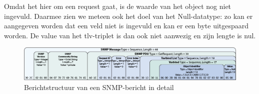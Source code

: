 Omdat het hier om een request gaat, is de waarde van het object nog niet ingevuld.
Daarmee zien we meteen ook het doel van het Null-datatype: zo kan er aangegeven worden dat een veld niet is ingevuld en kan er een byte uitgespaard worden.
De value van het \gls{tlv}-triplet is dan ook niet aanwezig en zijn lengte is nul.

\begin{figure}[h]
	\centering
	\includegraphics[scale=0.40]{figures/snmp/berichtstructuur-3}
	\caption[Berichtstructuur van een SNMP-bericht in detail]{Berichtstructuur van een SNMP-bericht in detail\cite{snmp-message-format}}
	\label{fig-berichtstructuur-3}
\end{figure}